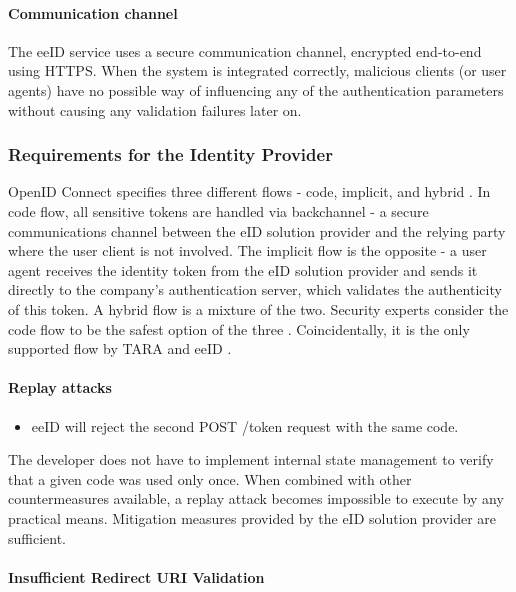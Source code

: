 \paragraph{Communication channel}

The eeID service uses a secure communication channel, encrypted end-to-end using HTTPS. When the system is integrated correctly, malicious clients (or user agents) have no possible way of influencing any of the authentication parameters without causing any validation failures later on.

\subsubsection{Requirements for the Identity Provider}

OpenID Connect specifies three different flows - code, implicit, and hybrid \cite{oidc}. In code flow, all sensitive tokens are handled via backchannel - a secure communications channel between the eID solution provider and the relying party where the user client is not involved. The implicit flow is the opposite - a user agent receives the identity token from the eID solution provider and sends it directly to the company's authentication server, which validates the authenticity of this token. A hybrid flow is a mixture of the two. Security experts consider the code flow to be the safest option of the three \cite{ietf-oauth-security-topics-19}. Coincidentally, it is the only supported flow by TARA and eeID \cite{tara-technical}.

\paragraph{Replay attacks}

\begin{itemize}
  \item eeID will reject the second POST /token request with the same code.
\end{itemize}

The developer does not have to implement internal state management to verify that a given code was used only once. When combined with other countermeasures available, a replay attack becomes impossible to execute by any practical means. Mitigation measures provided by the eID solution provider are sufficient.

\paragraph{Insufficient Redirect URI Validation}

